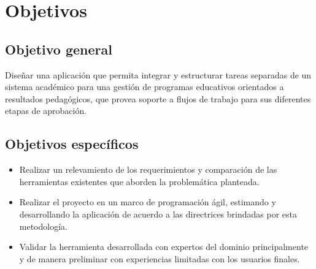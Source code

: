 \section{Objetivos}

\subsection{Objetivo general}
Diseñar una aplicación que permita integrar y estructurar tareas separadas de un sistema académico para una gestión de programas educativos orientados a resultados pedagógicos, que provea soporte a flujos de trabajo para sus diferentes etapas de aprobación.


\subsection{Objetivos específicos}
  \begin{itemize}
    \item Realizar un relevamiento de los requerimientos y comparación de las herramientas existentes que aborden la problemática planteada.
    \item Realizar el proyecto en un marco de programación ágil, estimando y desarrollando la aplicación de acuerdo a las directrices brindadas por esta metodología.
    \item Validar la herramienta desarrollada con expertos del dominio principalmente y de manera preliminar con experiencias limitadas con los usuarios finales.
  \end{itemize}